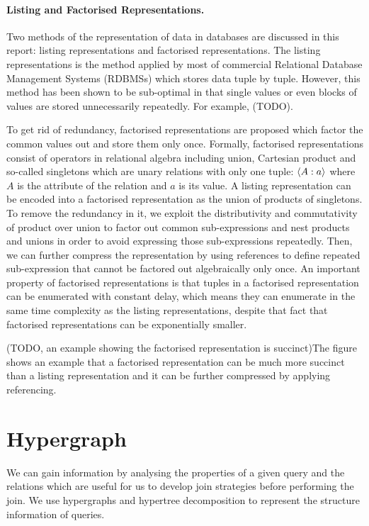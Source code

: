 \paragraph{Listing and Factorised Representations.}
Two methods of the representation of data in databases are discussed in this report: listing representations and factorised representations. The listing representations is the method applied by most of commercial Relational Database Management Systems (RDBMSs) which stores data tuple by tuple. However, this method has been shown to be sub-optimal in that single values or even blocks of values are stored unnecessarily repeatedly. For example, (TODO). 

To get rid of redundancy, factorised representations are proposed which factor the common values out and store them only once. 
Formally, factorised representations consist of operators in relational algebra including union, Cartesian product and so-called singletons which are unary relations with only one tuple: $\langle A:a\rangle$ where $A$ is the attribute of the relation and $a$ is its value. A listing representation can be encoded into a factorised representation as the union of products of singletons. To remove the redundancy in it, we exploit the distributivity and commutativity of product over union to factor out common sub-expressions and nest products and unions in order to avoid expressing those sub-expressions repeatedly. Then, we can further compress the representation by using references to define repeated sub-expression that cannot be factored out algebraically only once. An important property of factorised representations is that tuples in a factorised representation can be enumerated with constant delay, which means they can enumerate in the same time complexity as the listing representations, despite that fact that factorised representations can be exponentially smaller. 

(TODO, an example showing the factorised representation is succinct)The figure shows an example that a factorised representation can be much more succinct than a listing representation and it can be further compressed by applying referencing. 


\section{Hypergraph}
We can gain information by analysing the properties of a given query and the relations which are useful for us to develop join strategies before performing the join. We use hypergraphs and hypertree decomposition to represent the structure information of queries. 


